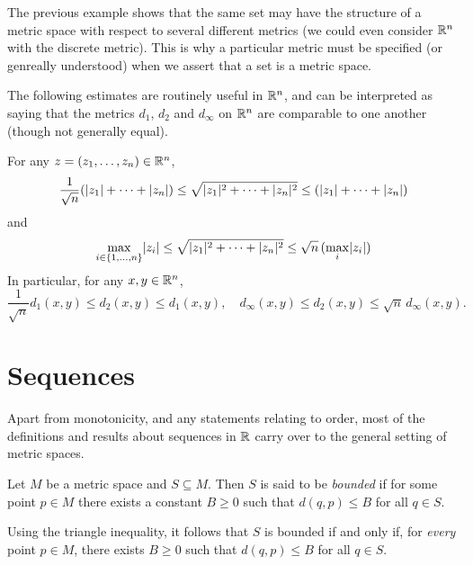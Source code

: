 \documentclass{book}
\begin{document}
\begin{rmk}
The previous example shows that the same set may have the structure of a metric
space with respect to several different metrics (we could even consider
$\mathbb{R}^n$ with the discrete metric). This is why a particular metric must be
specified (or genreally understood) when we assert that a set is a metric space.
\end{rmk}

The following estimates are routinely useful in $\mathbb{R}^n$, and can be interpreted as saying that the metrics $d_1$, $d_2$ and $d_\infty$ on $\mathbb{R}^n$
are comparable to one another (though not generally equal).
\begin{lem}
For any $z = (z_1,\ldots,z_n) \in \mathbb{R}^n$, 
\[
	\frac 1 {\sqrt n} (\lvert z_1\rvert + \cdots + \lvert z_n\rvert) \leq \sqrt{\lvert z_1\rvert^2 + \cdots + \lvert z_n\rvert^2} \leq (\lvert z_1\rvert + \cdots + \lvert z_n\rvert)
\]
and
\[
	\max_{i \in \left\{ 1,\ldots,n \right\}} \lvert z_i\rvert	\leq \sqrt{\lvert z_1\rvert^2 + \cdots + \lvert z_n\rvert^2} \leq \sqrt n\,(\max_{i} \lvert z_i\rvert)
\]
In particular, for any $x,y \in \mathbb{R}^n$, 
\[
	\frac 1 {\sqrt n} d_1(x,y) \leq d_2(x,y) \leq d_1(x,y), 
	\quad d_\infty(x,y) \leq d_2(x,y) \leq \sqrt n\, d_\infty(x,y).
\]
\label{L:Rn_dist_ests}
\end{lem}


\section{Sequences} \label{S:metric_seqs}
Apart from monotonicity, and any statements relating to order, most of the
definitions and results about sequences in $\mathbb{R}$ carry over to the general
setting of metric spaces.

\begin{defn}
Let $M$ be a metric space and $S \subseteq M$. Then $S$ is said to be {\em bounded} if for some point $p \in M$
there exists a constant $B \geq 0$ such that $d(q,p) \leq B$ for all $q \in S$. 
\label{D:metric_bounded}
\end{defn}

\begin{rmk}
Using the triangle inequality, it follows that $S$ is bounded if and only if, for {\em every} point $p \in M$, there exists
$B \geq 0$ such that $d(q,p) \leq B$ for all $q \in S$. 
\end{rmk}
\end{document}

